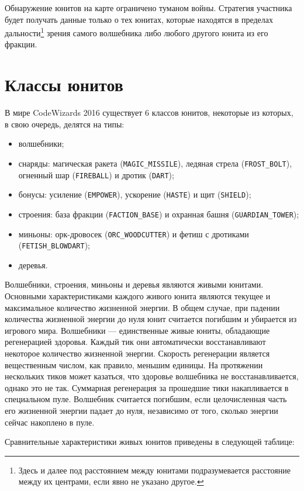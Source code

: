 Обнаружение юнитов на карте ограничено туманом войны. Стратегия участника будет получать данные только о тех юнитах, которые находятся в
пределах дальности\footnote[4]{Здесь и далее под расстоянием между юнитами подразумевается расстояние между их центрами, если явно не
указано другое.} зрения самого волшебника либо любого другого юнита из его фракции.

\section{Классы юнитов}

В мире CodeWizards 2016 существует $6$ классов юнитов, некоторые из которых, в свою очередь, делятся на типы:
\begin{itemize}
    \item волшебники;
    \item снаряды: магическая ракета (\texttt{MAGIC\_MISSILE}), ледяная стрела (\texttt{FROST\_BOLT}), огненный шар (\texttt{FIREBALL}) и
          дротик (\texttt{DART});
    \item бонусы: усиление (\texttt{EMPOWER}), ускорение (\texttt{HASTE}) и щит (\texttt{SHIELD});
    \item строения: база фракции (\texttt{FACTION\_BASE}) и охранная башня (\texttt{GUARDIAN\_TOWER});
    \item миньоны: орк-дровосек (\texttt{ORC\_WOODCUTTER}) и фетиш с дротиками (\texttt{FETISH\_BLOWDART});
    \item деревья.
\end{itemize}

Волшебники, строения, миньоны и деревья являются живыми юнитами. Основными характеристиками каждого живого юнита являются текущее и
максимальное количество жизненной энергии. В общем случае, при падении количества жизненной энергии до нуля юнит считается погибшим и
убирается из игрового мира. Волшебники --- единственные живые юниты, обладающие регенерацией здоровья. Каждый тик они автоматически
восстанавливают некоторое количество жизненной энергии. Скорость регенерации является вещественным числом, как правило, меньшим единицы.
На протяжении нескольких тиков может казаться, что здоровье волшебника не восстанавливается, однако это не так. Суммарная регенерация за
прошедшие тики накапливается в специальном пуле. Волшебник считается погибшим, если целочисленная часть его жизненной энергии падает до
нуля, независимо от того, сколько энергии сейчас накоплено в пуле.

Сравнительные характеристики живых юнитов приведены в следующей таблице:


